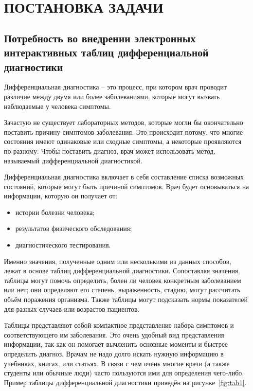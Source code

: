 \section{ПОСТАНОВКА ЗАДАЧИ}

\subsection{Потребность во внедрении электронных интерактивных таблиц дифференциальной диагностики}

Дифференциальная диагностика – это процесс, при котором врач проводит различие между двумя или более заболеваниями, которые могут вызвать наблюдаемые у человека симптомы.

Зачастую не существует лабораторных методов, которые могли бы окончательно поставить причину симптомов заболевания. Это происходит потому, что многие состояния имеют одинаковые или сходные симптомы, а некоторые проявляются по-разному. Чтобы поставить диагноз, врач может использовать метод, называемый дифференциальной диагностикой.

Дифференциальная диагностика включает в себя составление списка возможных состояний, которые могут быть причиной симптомов. Врач будет основываться на информации, которую он получает от:

\begin{itemize}
    \item истории болезни человека;
    \item результатов физического обследования;
    \item диагностического тестирования.
\end{itemize}

Именно значения, полученные одним или несколькими из данных способов, лежат в основе таблиц дифференциальной диагностики. Сопоставляя значения, таблицы могут помочь определить, болен ли человек конкретным заболеванием или нет; они определяют его степень, выраженность, стадию, могут рассчитать объём поражения организма. Также таблицы могут подсказать нормы показателей для разных случаев или возрастов пациентов.

Таблицы представляют собой компактное представление набора симптомов и соответствующего им заболевания. Это очень удобный вид представления информации, так как он помогает вычленить основные моменты и быстрее определить диагноз. Врачам не надо долго искать нужную информацию в учебниках, книгах, или статьях. В связи с чем очень многие врачи (а также студенты или обычные люди) часто пользуются ими для определения чего-либо. Пример таблицы дифференциальной диагностики приведён на рисунке~\ref{fig:tab1}.

